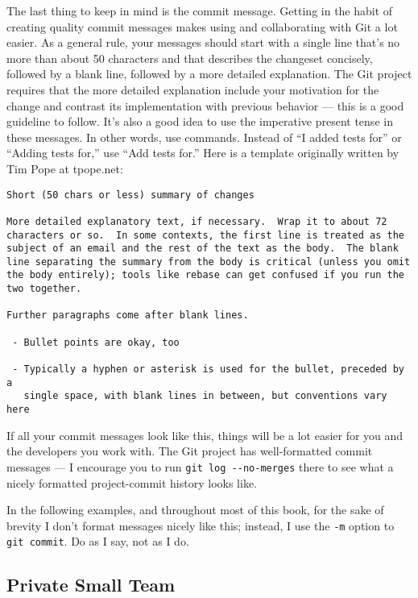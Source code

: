 \documentclass[a4paper]{book}
\begin{document}
The last thing to keep in mind is the commit message. Getting in the habit of creating quality commit messages makes using and collaborating with Git a lot easier. As a general rule, your messages should start with a single line that's no more than about 50 characters and that describes the changeset concisely, followed by a blank line, followed by a more detailed explanation. The Git project requires that the more detailed explanation include your motivation for the change and contrast its implementation with previous behavior --- this is a good guideline to follow. It's also a good idea to use the imperative present tense in these messages. In other words, use commands. Instead of “I added tests for” or “Adding tests for,” use “Add tests for.” Here is a template originally written by Tim Pope at tpope.net:

\begin{shaded}\begin{verbatim}
Short (50 chars or less) summary of changes

More detailed explanatory text, if necessary.  Wrap it to about 72
characters or so.  In some contexts, the first line is treated as the
subject of an email and the rest of the text as the body.  The blank
line separating the summary from the body is critical (unless you omit
the body entirely); tools like rebase can get confused if you run the
two together.

Further paragraphs come after blank lines.

 - Bullet points are okay, too

 - Typically a hyphen or asterisk is used for the bullet, preceded by a
   single space, with blank lines in between, but conventions vary here
\end{verbatim}\end{shaded}

If all your commit messages look like this, things will be a lot easier for you and the developers you work with. The Git project has well-formatted commit messages --- I encourage you to run \texttt{git log -{}-no-merges} there to see what a nicely formatted project-commit history looks like.

In the following examples, and throughout most of this book, for the sake of brevity I don't format messages nicely like this; instead, I use the \texttt{-m} option to \texttt{git commit}. Do as I say, not as I do.

\subsection{Private Small Team}\label{private-small-team}
\end{document}
